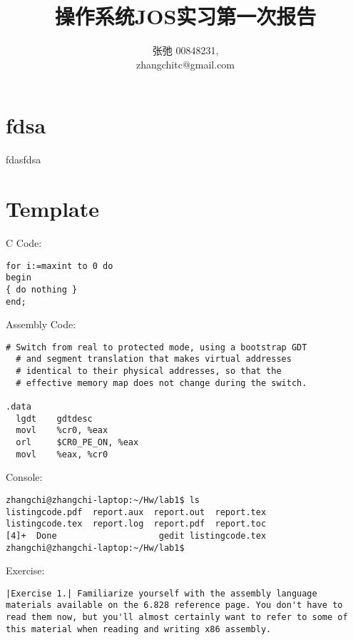 \documentclass{article}
\begin{document}
\begin{CJK*}{UTF8}{gkai}

\title{操作系统JOS实习第一次报告}
\author{张弛 \hspace{1ex} 00848231, \\
        zhangchitc@gmail.com}

\maketitle
\tableofcontents
\newpage

\section{fdsa}
fdasfdsa


\section{Template}

C Code:
\begin{lstlisting}[style=ccode]
for i:=maxint to 0 do
begin
{ do nothing }
end;
\end{lstlisting}

Assembly Code:
\begin{lstlisting}[style=acode]
  # Switch from real to protected mode, using a bootstrap GDT
  # and segment translation that makes virtual addresses
  # identical to their physical addresses, so that the
  # effective memory map does not change during the switch.
  
.data
  lgdt    gdtdesc
  movl    %cr0, %eax
  orl     $CR0_PE_ON, %eax
  movl    %eax, %cr0

\end{lstlisting}

Console:
\begin{lstlisting}[style=console]
zhangchi@zhangchi-laptop:~/Hw/lab1$ ls
listingcode.pdf  report.aux  report.out  report.tex
listingcode.tex  report.log  report.pdf  report.toc
[4]+  Done                    gedit listingcode.tex
zhangchi@zhangchi-laptop:~/Hw/lab1$ 

\end{lstlisting}

Exercise:
\begin{lstlisting}[style=exercise]
|Exercise 1.| Familiarize yourself with the assembly language materials available on the 6.828 reference page. You don't have to read them now, but you'll almost certainly want to refer to some of this material when reading and writing x86 assembly.


\end{lstlisting}
\end{CJK*}
\end{document}
